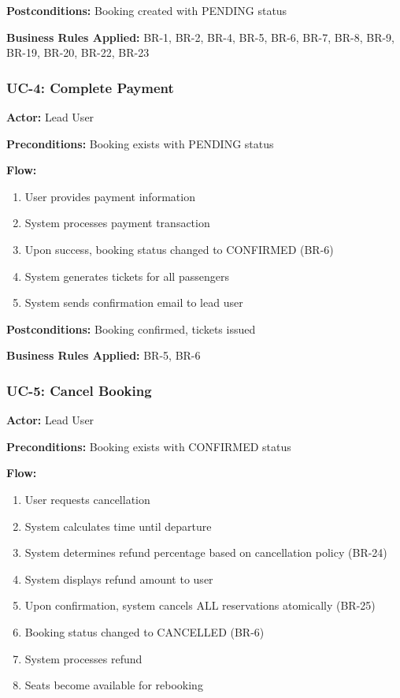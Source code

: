 \documentclass[12pt,a4paper,openany]{report}
\begin{document}
\textbf{Postconditions:} Booking created with PENDING status

\textbf{Business Rules Applied:} BR-1, BR-2, BR-4, BR-5, BR-6, BR-7, BR-8, BR-9, BR-19, BR-20, BR-22, BR-23

\subsubsection{UC-4: Complete Payment}
\textbf{Actor:} Lead User

\textbf{Preconditions:} Booking exists with PENDING status

\textbf{Flow:}
\begin{enumerate}
    \item User provides payment information
    \item System processes payment transaction
    \item Upon success, booking status changed to CONFIRMED (BR-6)
    \item System generates tickets for all passengers
    \item System sends confirmation email to lead user
\end{enumerate}

\textbf{Postconditions:} Booking confirmed, tickets issued

\textbf{Business Rules Applied:} BR-5, BR-6

\subsubsection{UC-5: Cancel Booking}
\textbf{Actor:} Lead User

\textbf{Preconditions:} Booking exists with CONFIRMED status

\textbf{Flow:}
\begin{enumerate}
    \item User requests cancellation
    \item System calculates time until departure
    \item System determines refund percentage based on cancellation policy (BR-24)
    \item System displays refund amount to user
    \item Upon confirmation, system cancels ALL reservations atomically (BR-25)
    \item Booking status changed to CANCELLED (BR-6)
    \item System processes refund
    \item Seats become available for rebooking
\end{enumerate}
\end{document}
